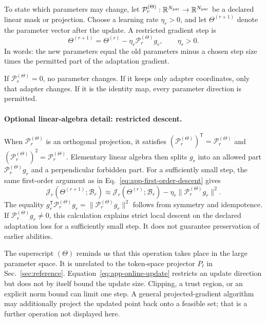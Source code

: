 \documentclass[
  aps,
  reprint,
  superscriptaddress,
  floatfix,
  nofootinbib,
  longbibliography
]{revtex4-2}
\newcommand{\R}{\mathbb{R}}
\newcommand{\T}{^{\mathsf{T}}}
\newcommand{\norm}[1]{\lVert #1 \rVert}
\begin{document}
To state which parameters may change, let
$\mathcal P_r^{(\Theta)}:\R^{N_{\rm par}}\to\R^{N_{\rm par}}$ be a declared
linear mask or projection.  Choose a learning rate $\eta_r>0$, and let
$\Theta^{(r+1)}$ denote the parameter vector after the update.  A restricted
gradient step is
\begin{equation}
\label{eq:app-online-update}
\Theta^{(r+1)}
=\Theta^{(r)}-\eta_r\mathcal P_r^{(\Theta)}g_r,
\qquad \eta_r>0.
\end{equation}
In words: the new parameters equal the old parameters minus a chosen step size
times the permitted part of the adaptation gradient.

If $\mathcal P_r^{(\Theta)}=0$, no parameter changes.  If it keeps only adapter
coordinates, only that adapter changes.  If it is the identity map, every
parameter direction is permitted.

\paragraph{Optional linear-algebra detail: restricted descent.}
When $\mathcal P_r^{(\Theta)}$ is an orthogonal projection, it satisfies
$(\mathcal P_r^{(\Theta)})\T=\mathcal P_r^{(\Theta)}$ and
$(\mathcal P_r^{(\Theta)})^2=\mathcal P_r^{(\Theta)}$.  Elementary linear
algebra then splits $g_r$ into an allowed part
$\mathcal P_r^{(\Theta)}g_r$ and a perpendicular forbidden part.  For a
sufficiently small step, the same first-order argument as in
Eq.~\eqref{eq:app-first-order-descent} gives
\begin{equation}
\label{eq:app-restricted-descent}
\mathcal J_r(\Theta^{(r+1)};\mathcal B_r)
\approx
\mathcal J_r(\Theta^{(r)};\mathcal B_r)
-\eta_r\norm{\mathcal P_r^{(\Theta)}g_r}^{2}.
\end{equation}
The equality $g_r\T\mathcal P_r^{(\Theta)}g_r
=\norm{\mathcal P_r^{(\Theta)}g_r}^{2}$ follows from symmetry and
idempotence.  If $\mathcal P_r^{(\Theta)}g_r\ne0$, this calculation explains
strict local descent on the declared adaptation loss for a sufficiently small
step.  It does not guarantee preservation of earlier abilities.

The superscript $(\Theta)$ reminds us that this operation takes place in the
large parameter space.  It is unrelated to the token-space projector $P_t$ in
Sec.~\ref{sec:reference}.  Equation~\eqref{eq:app-online-update} restricts an
update direction but does not by itself bound the update size.  Clipping, a
trust region, or an explicit norm bound can limit one step.  A general
projected-gradient algorithm may additionally project the updated point back
onto a feasible set; that is a further operation not displayed here.
\end{document}
